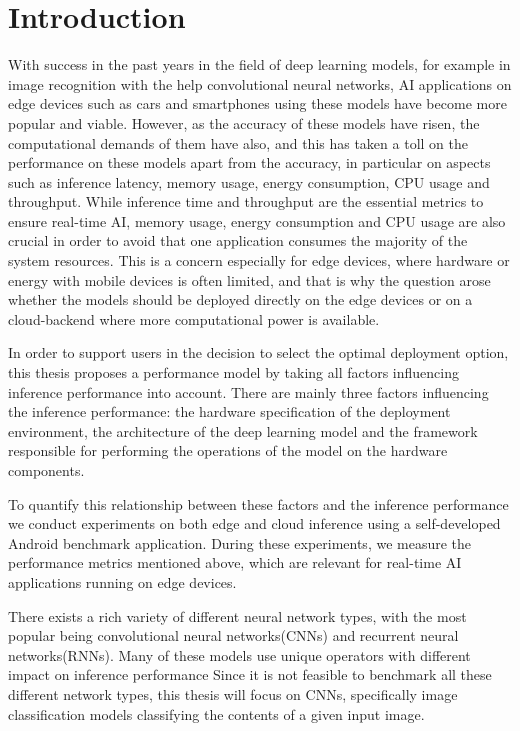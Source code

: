 \chapter{Introduction}



With success in the past years in the field of deep learning models, for example in image recognition with the help convolutional neural networks, AI applications on edge devices such as cars and smartphones using these models have become more popular and viable.
However, as the accuracy of these models have risen, the computational demands of them have also, and this has taken a toll on the performance on these models apart from the accuracy, in particular on aspects such as inference latency, memory usage, energy consumption, CPU usage and throughput. 
While inference time and throughput are the essential metrics to ensure real-time AI, memory usage, energy consumption and CPU usage are also crucial in order to avoid that one application consumes the majority of the system resources.
This is a concern especially for edge devices, where hardware or energy with mobile devices is often limited, and that is why the question arose whether the models should be deployed directly on the edge devices or on a cloud-backend where more computational power is available. 


In order to support users in the decision to select the optimal deployment option, this thesis proposes a performance model by taking all factors influencing inference performance into account.
There are mainly three factors influencing the inference performance: the hardware specification of the deployment environment, the architecture of the deep learning model and the framework responsible for performing the operations of the model on the hardware components.

To quantify this relationship between these factors and the inference performance we conduct experiments on both edge and cloud inference using a self-developed Android benchmark application.
During these experiments, we measure the performance metrics mentioned above, which are relevant for real-time AI applications running on edge devices.

There exists a rich variety of different neural network types, with the most popular being convolutional neural networks(CNNs) and recurrent neural networks(RNNs).
Many of these models use unique operators with different impact on inference performance
Since it is not feasible to benchmark all these different network types, this thesis will focus on CNNs, specifically image classification models classifying the contents of a given input image.




